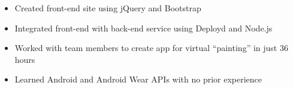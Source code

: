 \documentclass[10pt]{article}
\begin{document}

	\begin{itemize}[noitemsep,topsep=0.25em]
		\item Created front-end site using jQuery and Bootstrap
		\item Integrated front-end with back-end service using Deployd and Node.js
	\end{itemize}


	\begin{itemize}[noitemsep,topsep=0.25em]
		\item Worked with team members to create app for virtual ``painting'' in just 36 hours
		\item Learned Android and Android Wear APIs with no prior experience
	\end{itemize}
\end{document}
